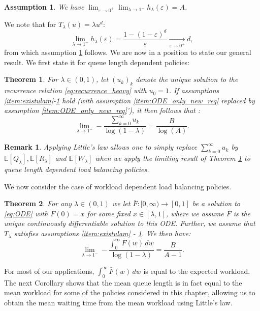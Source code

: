 \documentclass[12pt]{report}
\newcommand{\E}{\mathbb{E}}
\newtheorem{theorem}{Theorem}
\newtheorem{remark}{Remark}
\newtheorem{assumption}{Assumption}
\begin{document}
\begin{assumption} \label{item:lim_heps}
We have $\lim_{\varepsilon \rightarrow 0^+} \lim_{\lambda\rightarrow 1^-} h_{\lambda}(\varepsilon) = A$.
\end{assumption}
We note that for $T_\lambda(u)=\lambda u^d$:
$$
\lim_{\lambda \rightarrow 1^-} h_{\lambda}(\varepsilon)
=
\frac{1-(1-\varepsilon)^d}{\varepsilon}
\underset{\varepsilon \rightarrow 0^+}{\longrightarrow} d,
$$
from which assumption \ref{item:lim_heps} follows. We are now in a position to state our general result. We first state it for queue length dependent policies:
\begin{theorem}\label{thm:gen_result_recurrence}
	For $\lambda \in (0,1)$, let $(u_k)_k$ denote the unique solution to the recurrence relation \eqref{eq:recurrence_heavy} with $u_0 = 1$. If assumptions \ref{item:existulam}-\ref{item:lim_heps} hold (with assumption \ref{item:ODE_only_new_req} replaced by assumption \ref{item:ODE_only_new_req}'), it then follows that :
	\begin{equation} \label{eq:gen_lim_recurrence}
		\lim_{\lambda \rightarrow 1^-} - \frac{\sum_{k=0}^\infty u_k}{\log(1-\lambda)} = \frac{B}{\log(A)}.
	\end{equation}
\end{theorem}
\begin{remark}
Applying Little's law allows one to simply replace $\sum_{k=0}^\infty u_k$ by $\E[Q_\lambda], \E[R_\lambda]$ and $\E[W_\lambda]$ when we apply the limiting result of Theorem \ref{thm:gen_result_recurrence} to queue length dependent load balancing policies. 
\end{remark}

We now consider the case of workload dependent load balancing policies.
\begin{theorem}\label{thm:gen_result_ODE}
For any $\lambda \in (0,1)$ we let $\bar F:[0,\infty) \rightarrow [0,1]$ be a solution to \eqref{eq:ODE} with $\bar F(0)=x$ for some fixed $x \in [\lambda, 1]$, where we assume $\bar F$ is the unique continuously differentiable solution to this ODE. Further, we assume that $T_\lambda$ satisfies assumptions \ref{item:existulam} - \ref{item:lim_heps}. We then have:
\begin{equation}\label{eq:gen_lim}
\lim_{\lambda\rightarrow 1^-} - \frac{\int_0^\infty \bar F(w)\, dw}{\log(1-\lambda)} = \frac{B}{A-1}.
\end{equation}
\end{theorem}

For most of our applications, $\int_0^\infty \bar F(w) \, dw$ is equal to the expected workload.
 The next Corollary shows  that the mean queue length is in fact equal to the mean workload
 for some of the policies considered in this chapter, allowing us to obtain the mean waiting
 time from the mean workload using Little's law.
 
\end{document}
